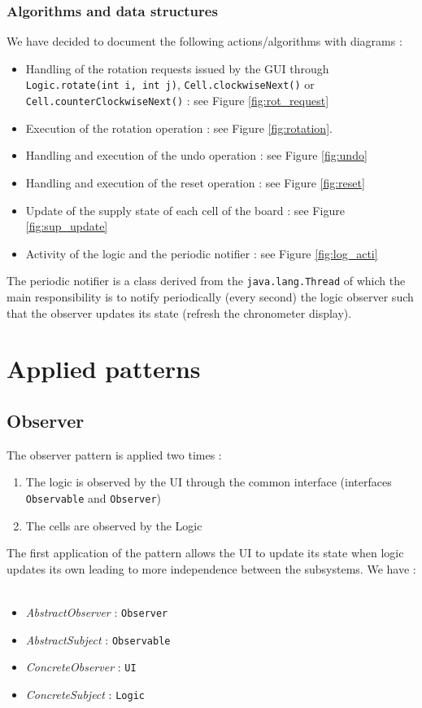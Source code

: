 \documentclass[a4paper,11pt]{article}
\begin{document}
\subsubsection{Algorithms and data structures}
We have decided to document the following actions/algorithms with diagrams :
\begin{itemize}
	\item Handling of the rotation requests issued by the GUI through \texttt{Logic.rotate(int i, int j)}, \texttt{Cell.clockwiseNext()} or \texttt{Cell.counterClockwiseNext()} : see Figure \ref{fig:rot_request}
	\item Execution of the rotation operation : see Figure \ref{fig:rotation}.
	\item Handling and execution of the undo operation  : see Figure \ref{fig:undo}
	\item Handling and execution of the reset operation : see Figure \ref{fig:reset}
	\item Update of the supply state of each cell of the board : see Figure \ref{fig:sup_update}
	\item Activity of the logic and the periodic notifier : see Figure \ref{fig:log_acti}
\end{itemize}
The periodic notifier is a class derived from the \texttt{java.lang.Thread} of which the main responsibility is to notify periodically (every second) the logic observer such that the observer updates its state (refresh the chronometer display).
\section{Applied patterns}
\label{sec:patterns}
\subsection{Observer}
The observer pattern is applied two times : 
\begin{enumerate}
	\item The logic is observed by the UI through the common interface (interfaces \texttt{Observable} and \texttt{Observer})
	\item The cells are observed by the Logic
\end{enumerate}
The first application of the pattern allows the UI to update its state when logic updates its own leading to more independence between the subsystems. We have : \\ \\
\begin{itemize}
	\item \textit{AbstractObserver} : \texttt{Observer}
	\item \textit{AbstractSubject} : \texttt{Observable}
	\item \textit{ConcreteObserver} : \texttt{UI}
	\item \textit{ConcreteSubject} : \texttt{Logic}
\end{itemize}
\end{document}
